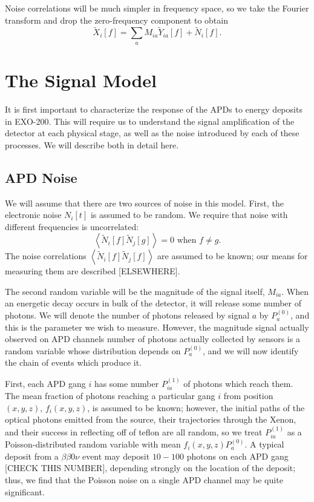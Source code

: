 Noise correlations will be much simpler in frequency space, so we take the Fourier transform and drop the zero-frequency component to obtain \[\widetilde{X}_i[f] = \sum_a M_{ia}\widetilde{Y}_{ia}[f] + \widetilde{N}_i[f].\]

\section{The Signal Model}

It is first important to characterize the response of the APDs to energy deposits in EXO-200.  This will require us to understand the signal amplification of the detector at each physical stage, as well as the noise introduced by each of these processes.  We will describe both in detail here.

\subsection{APD Noise}

We will assume that there are two sources of noise in this model.  First, the electronic noise $N_i[t]$ is assumed to be random.  We require that noise with different frequencies is uncorrelated:
\[\left< \widetilde{N}_i[f] \widetilde{N}_j[g] \right> = 0 \text{~when~} f \ne g.\]
The noise correlations $\left< \widetilde{N}_i[f] \widetilde{N}_j[f] \right>$ are assumed to be known; our means for measuring them are described [ELSEWHERE].

The second random variable will be the magnitude of the signal itself, $M_{ia}$.  When an energetic decay occurs in bulk of the detector, it will release some number of photons.  We will denote the number of photons released by signal $a$ by $P^{(0)}_a$, and this is the parameter we wish to measure.  However, the magnitude signal actually observed on APD channels number of photons actually collected by sensors is a random variable whose distribution depends on $P^{(0)}_a$, and we will now identify the chain of events which produce it.

First, each APD gang $i$ has some number $P^{(1)}_{ia}$ of photons which reach them.  The mean fraction of photons reaching a particular gang $i$ from position $(x,y,z)$, $f_i(x,y,z)$, is assumed to be known; however, the initial paths of the optical photons emitted from the source, their trajectories through the Xenon, and their success in reflecting off of teflon are all random, so we treat $P^{(1)}_{ia}$ as a Poisson-distributed random variable with mean $f_i(x,y,z)P^{(0)}_a$.  A typical deposit from a $\beta\beta 0\nu$ event may deposit $10-100$ photons on each APD gang [CHECK THIS NUMBER], depending strongly on the location of the deposit; thus, we find that the Poisson noise on a single APD channel may be quite significant.

